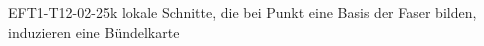 
\begin{REM}{EFT1-T12-02-25}{k lokale Schnitte, die bei Punkt eine Basis der Faser bilden, induzieren eine Bündelkarte}
\end{REM}
